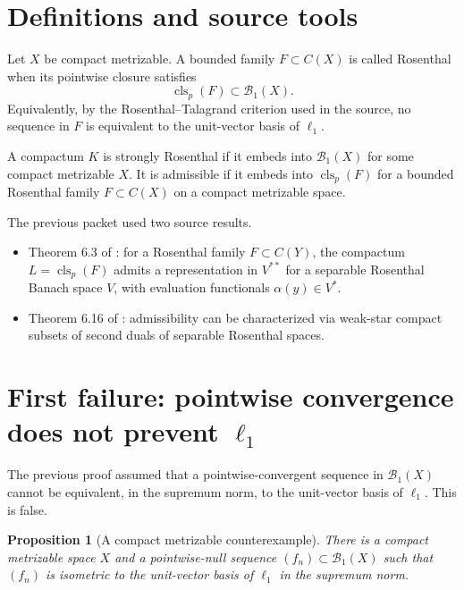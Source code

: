 \documentclass[11pt]{article}
\newtheorem{proposition}[theorem]{Proposition}
\newcommand{\Baire}{\mathcal B_1}
\newcommand{\clp}{\operatorname{cls}_p}
\begin{document}
\section{Definitions and source tools}

Let \(X\) be compact metrizable.  A bounded family \(F\subset C(X)\) is called
Rosenthal when its pointwise closure satisfies
\[
   \clp(F)\subset \Baire(X).
\]
Equivalently, by the Rosenthal--Talagrand criterion used in the source, no
sequence in \(F\) is equivalent to the unit-vector basis of \(\ell_1\).

A compactum \(K\) is strongly Rosenthal if it embeds into \(\Baire(X)\) for
some compact metrizable \(X\).  It is admissible if it embeds into
\(\clp(F)\) for a bounded Rosenthal family \(F\subset C(X)\) on a compact
metrizable space.

The previous packet used two source results.

\begin{itemize}[leftmargin=2em]
\item Theorem 6.3 of \cite{GM0803}: for a Rosenthal family
      \(F\subset C(Y)\), the compactum \(L=\clp(F)\) admits a representation
      in \(V^{**}\) for a separable Rosenthal Banach space \(V\), with
      evaluation functionals \(\alpha(y)\in V^*\).
\item Theorem 6.16 of \cite{GM0803}: admissibility can be characterized via
      weak-star compact subsets of second duals of separable Rosenthal spaces.
\end{itemize}

\section{First failure: pointwise convergence does not prevent \(\ell_1\)}
\label{sec:l1failure}

The previous proof assumed that a pointwise-convergent sequence in
\(\Baire(X)\) cannot be equivalent, in the supremum norm, to the unit-vector
basis of \(\ell_1\).  This is false.

\begin{proposition}[A compact metrizable counterexample]
\label{prop:l1pointwise}
There is a compact metrizable space \(X\) and a pointwise-null sequence
\((f_n)\subset\Baire(X)\) such that \((f_n)\) is isometric to the unit-vector
basis of \(\ell_1\) in the supremum norm.
\end{proposition}
\end{document}
